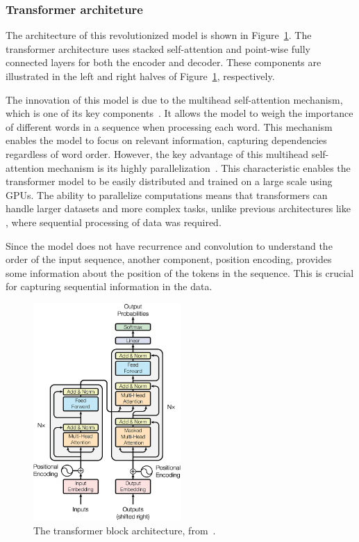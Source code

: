 \subsubsection{Transformer architeture}

The architecture of this revolutionized model is shown in Figure~\ref{fig_trans_arch}. The transformer architecture uses stacked self-attention and point-wise fully connected layers for both the encoder and decoder. These components are illustrated in the left and right halves of Figure~\ref{fig_trans_arch}, respectively.

The innovation of this model is due to the multihead self-attention mechanism, which is one of its key components~\cite{vaswani_attention_2023, hadi_LLM_2023}. It allows the model to weigh the importance of different words in a sequence when processing each word. This mechanism enables the model to focus on relevant information, capturing dependencies regardless of word order. However, the key advantage of this multihead self-attention mechanism is its highly parallelization~\cite{vaswani_attention_2023}. This characteristic enables the transformer model to be easily distributed and trained on a large scale using GPUs. The ability to parallelize computations means that transformers can handle larger datasets and more complex tasks, unlike previous architectures like {\rnn}, where sequential processing of data was required.

Since the model does not have recurrence and convolution to understand the order of the input sequence, another component, position encoding, provides some information about the position of the tokens in the sequence. This is crucial for capturing sequential information in the data. 

\begin{figure}[ht]
    \includegraphics[width=0.5\textwidth]{figs/chapter2/transformer.png}
    \centering
    \caption[The transformer block architecture]{The transformer block architecture, from~\citet{vaswani_attention_2023}.}
    \label{fig_trans_arch}
\end{figure}



